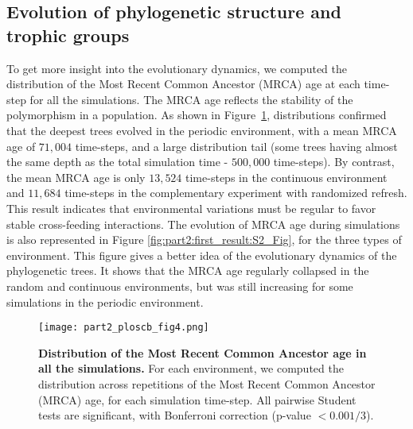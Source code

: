 
\subsection*{Evolution of phylogenetic structure and trophic groups}

To get more insight into the evolutionary dynamics, we computed the distribution of the Most Recent Common Ancestor (MRCA) age at each time-step for all the simulations. The MRCA age reflects the stability of the polymorphism in a population. As shown in Figure~\ref{fig:part2:first_result:Fig4}, distributions confirmed that the deepest trees evolved in the periodic environment, with a mean MRCA age of $71,004$ time-steps, and a large distribution tail (some trees having almost the same depth as the total simulation time - $500,000$ time-steps). By contrast, the mean MRCA age is only $13,524$ time-steps in the continuous environment and $11,684$ time-steps in the complementary experiment with randomized refresh.
This result indicates that environmental variations must be regular to favor stable cross-feeding interactions. The evolution of MRCA age during simulations is also represented in Figure \ref{fig:part2:first_result:S2_Fig}, for the three types of environment. This figure gives a better idea of the evolutionary dynamics of the phylogenetic trees. It shows that the MRCA age regularly collapsed in the random and continuous environments, but was still increasing for some simulations in the periodic environment.

\begin{figure}[!h]
\centering
\texttt{[image: part2\_ploscb\_fig4.png]}
\caption[Distribution of the Most Recent Common Ancestor age in all the simulations.]{{\bf Distribution of the Most Recent Common Ancestor age in all the simulations.} For each environment, we computed the distribution across repetitions of the Most Recent Common Ancestor (MRCA) age, for each simulation time-step. All pairwise Student tests are significant, with Bonferroni correction (p-value $< 0.001/3$).}
\label{fig:part2:first_result:Fig4}
\end{figure}


